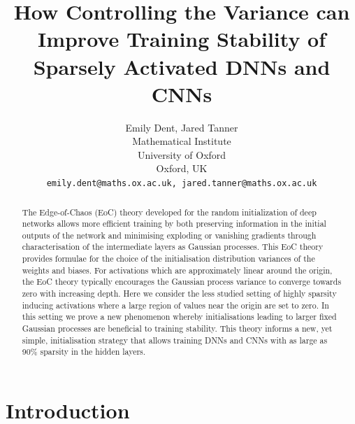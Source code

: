 \documentclass{article}
\title{How Controlling the Variance can Improve Training Stability of Sparsely Activated DNNs and CNNs}
\author{%
  Emily Dent, Jared Tanner\\
  Mathematical Institute\\
  University of Oxford\\
  Oxford, UK \\
  \texttt{{emily.dent@maths.ox.ac.uk, jared.tanner}@maths.ox.ac.uk}\\
}
\theoremstyle{plain}
\theoremstyle{definition}
\theoremstyle{remark}
\begin{document}
\maketitle






\begin{abstract}
    The Edge-of-Chaos (EoC) theory developed for the random initialization of deep networks allows more efficient training by both preserving information in the initial outputs of the network and minimising exploding or vanishing gradients through characterisation of the intermediate layers as Gaussian processes. This EoC theory provides formulae for the choice of the initialisation distribution variances of the weights and biases. For activations which are approximately linear around the origin, the EoC theory typically encourages the Gaussian process variance to converge towards zero with increasing depth. Here we consider the less studied setting of highly sparsity inducing activations where a large region of values near the origin are set to zero. In this setting we prove a new phenomenon whereby initialisations leading to larger fixed Gaussian processes are beneficial to training stability. This theory informs a new, yet simple, initialisation strategy that allows training DNNs and CNNs with as large as 90\% sparsity in the hidden layers.
\end{abstract}

\section{Introduction}
\end{document}
